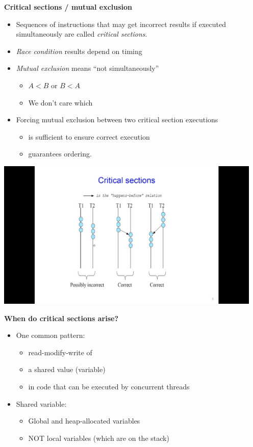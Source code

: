 \documentclass[11pt,a4paper]{article}
\begin{document}
\textbf{Critical sections / mutual exclusion}
\begin{itemize}
    \item Sequences of instructions that may get incorrect results if executed simultaneously
        are called \emph{critical sections}.
    \item \emph{Race condition} results depend on timing
    \item \emph{Mutual exclusion} means ``not simultaneously''
        \begin{itemize}
            \item $A < B$ or $B < A$
            \item We don't care which
        \end{itemize}
    \item Forcing mutual exclusion between two critical section executions
        \begin{itemize}
            \item is sufficient to ensure correct execution
            \item guarantees ordering.
        \end{itemize}
\end{itemize}

\includegraphics[height=270]{critical-sections.jpg}

\textbf{When do critical sections arise?}
\begin{itemize}
    \item One common pattern:
        \begin{itemize}
            \item read-modify-write of
            \item a shared value (variable)
            \item in code that can be executed by concurrent threads
        \end{itemize}
    \item Shared variable:
        \begin{itemize}
            \item Global and heap-allocated variables
            \item NOT local variables (which are on the stack)
        \end{itemize}
\end{itemize}
\end{document}
